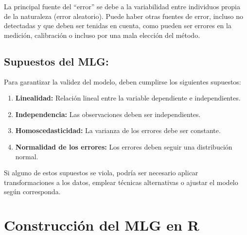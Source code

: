\documentclass[
  spanish,
  a4paper,
]{scrbook}
\begin{document}
\begin{tcolorbox}[enhanced jigsaw, arc=.35mm, bottomrule=.15mm, breakable, colback=white, colframe=quarto-callout-warning-color-frame, left=2mm, leftrule=.75mm, opacityback=0, rightrule=.15mm, toprule=.15mm]
\begin{minipage}[t]{5.5mm}
\textcolor{quarto-callout-warning-color}{\faExclamationTriangle}
\end{minipage}%
\begin{minipage}[t]{\textwidth - 5.5mm}

La principal fuente del ``error'' se debe a la variabilidad entre
individuos propia de la naturaleza (error aleatorio). Puede haber otras
fuentes de error, incluso no detectadas y que deben ser tenidas en
cuenta, como pueden ser errores en la medición, calibración o incluso
por una mala elección del método.

\end{minipage}%
\end{tcolorbox}

\subsection{Supuestos del MLG:}\label{supuestos-del-mlg}

Para garantizar la validez del modelo, deben cumplirse los siguientes
supuestos:

\begin{enumerate}
\def\labelenumi{\arabic{enumi}.}
\item
  \textbf{Linealidad:} Relación lineal entre la variable dependiente e
  independientes.
\item
  \textbf{Independencia:} Las observaciones deben ser independientes.
\item
  \textbf{Homoscedasticidad:} La varianza de los errores debe ser
  constante.
\item
  \textbf{Normalidad de los errores:} Los errores deben seguir una
  distribución normal.
\end{enumerate}

Si alguno de estos supuestos se viola, podría ser necesario aplicar
transformaciones a los datos, emplear técnicas alternativas o ajustar el
modelo según corresponda.

\section{Construcción del MLG en R}\label{construcciuxf3n-del-mlg-en-r}
\end{document}
